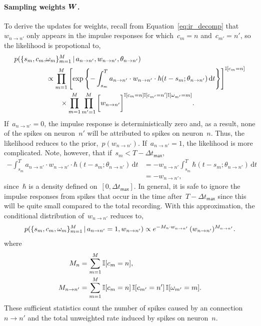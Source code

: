 \paragraph{Sampling weights $\boldsymbol{W}$.} 
To derive the updates for weights, recall from
Equation~\ref{eq:ir_decomp} that~${w_{n \to n'}}$ only
appears in the impulse responses for which~${c_m=n}$
and~${c_{m'}=n'}$, so the likelihood is propotional to,
\begin{align*}
  p(\{s_m, c_m, & \omega_m\}^M_{m=1} \,|\, a_{n \to n'}, w_{n \to n'}, 
  \theta_{n \to n'}) \\
  &\propto \prod_{m=1}^M\left[
    \exp\left\{-\int^T_{s_m} a_{n \to n'} \cdot w_{n \to n'} \cdot \hbar(t - s_m; \theta_{n \to n'}) \, \mathrm{d}t
    \right\} \right]^{\mathbb{I}[c_m=n]} \\
  &\qquad \times \prod_{m=1}^M \prod_{m'=1}^M \bigg[
    w_{n \to n'}\bigg]^{\mathbb{I}[c_{m}=n] \mathbb{I}[c_{m'}=n'] \mathbb{I}[\omega_{m'}=m]}.
\end{align*}
If~${a_{n \to n'}=0}$, the impulse response is deterministically zero
and, as a result, none of the spikes on neuron~$n'$ will be attributed to spikes
on neuron~$n$. Thus, the likelihood reduces to the prior,~$p(w_{n \to n'})$.
If~${a_{n \to n'}=1}$, the likelihood is more complicated.
Note, however, that if~$s_m < T - \Delta t_{\mathsf{max}}$,
\begin{align*}
  -\int^T_{s_m} a_{n \to n'} \cdot w_{n \to n'} \cdot
  \hbar(t - s_m; \theta_{n \to n'}) \, \mathrm{d}t
  &= -w_{n \to n'}  \int^T_{s_m} \hbar(t - s_m; \theta_{n \to n'}) \, \mathrm{d}t \\
  &= - w_{n \to n'},
\end{align*}
since~$\hbar$ is a density defined on~$[0,\Delta t_{\mathsf{max}}]$.
In general, it is safe to ignore the impulse responses from spikes that 
occur in the time after~$T-\Delta t_{\mathsf{max}}$ since this will be 
quite small compared to the total recording. 
With this approximation, the conditional distribution of~$w_{n \to n'}$
reduces to,
\begin{align*}
  p(\{s_m,c_m, \omega_m\}^M_{m=1} \,|\, a_{n \to n'}=1, w_{n \to n'}) 
  \propto 
  e^{-M_n \cdot w_{n \to n'}}  \,
  (w_{n \to n'})^{M_{n \to n'}}.
\end{align*}
where
\begin{align*}
  M_{n} &= \sum_{m=1}^M \mathbb{I}[c_{m}=n], \\
  M_{n \to n'} &= \sum_{m=1}^M \mathbb{I}[c_{m}=n] \, \mathbb{I}[c_{m'}=n'] \, \mathbb{I}[\omega_{m'}=m].
\end{align*}
These sufficient statistics count the number of spikes caused
by an connection~${n \to n'}$ and the total unweighted rate induced by
spikes on neuron~$n$.

